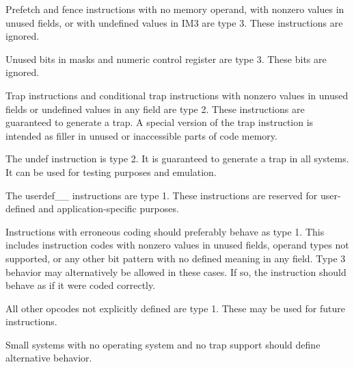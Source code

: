 \documentclass[forwardcom.tex]{subfiles}
\begin{document}
Prefetch and fence instructions with no memory operand, with nonzero values in unused fields, or with undefined values in IM3 are type 3. These instructions are ignored.
\vspace{2mm}

Unused bits in masks and numeric control register are type 3. These bits are ignored.
\vspace{2mm}

Trap instructions and conditional trap instructions with nonzero values in unused fields or undefined values in any field are type 2. These instructions are guaranteed to generate a trap. A special version of the trap instruction is intended as filler in unused or inaccessible parts of code memory.
\vspace{2mm}

The undef instruction is type 2. It is guaranteed to generate a trap in all systems. It can be used for testing purposes and emulation.
\vspace{2mm}

The userdef\_\_ instructions are type 1. These instructions are reserved for user-defined and application-specific purposes.
\vspace{2mm}

Instructions with erroneous coding should preferably behave as type 1. This includes instruction codes with nonzero values in unused fields, operand types not supported, or any other bit pattern with no defined meaning in any field. Type 3 behavior may alternatively be allowed in these cases. If so, the instruction should behave as if it were coded correctly.
\vspace{2mm}

All other opcodes not explicitly defined are type 1. These may be used for future instructions.
\vspace{2mm}

Small systems with no operating system and no trap support should define alternative behavior.

 
\end{document}
